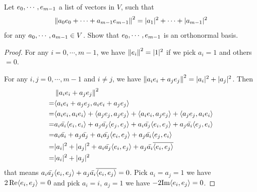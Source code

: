 \documentclass[../main.tex]{subfiles}
\begin{document}
\setcounter{section}{6}

\begin{exercise}
  Let $\join{e}{m - 1}$ a list of vectors in $V$, such that
  \[
  \norm{\joinp[+]{a}{e}{m - 1}}^2 = |a_1|^2 + \cdots + |a_{m - 1}|^2
  \]
  for any $\join{a}{m - 1} \in V$.
  Show that $\join{e}{m - 1}$ is an orthonormal basis.
\end{exercise}
\begin{proof}
  For any $i = 0, \cdots, m - 1$, we have $\norm{e_i}^2 = |1|^2$
  if we pick $a_i = 1$ and others $= 0$.

  For any $i, j = 0, \cdots, m - 1$ and $i \neq j$, we have
  $\norm{a_ie_i + a_je_j}^2 = |a_i|^2 + |a_j|^2$. Then
  \begin{align*}
     & \norm{a_ie_i + a_je_j}^2 \\
    =& \ip{a_ie_i + a_je_j}{a_ie_i + a_je_j} \\
    =& \ip{a_ie_i}{a_ie_i} + \ip{a_je_j}{a_je_j} + \ip{a_ie_i}{a_je_j} + \ip{a_je_j}{a_ie_i} \\
    =& a_i\bar{a_i}\ip{e_i}{e_i} + a_j\bar{a_j}\ip{e_j}{e_j} + a_i\bar{a_j}\ip{e_i}{e_j} + a_j\bar{a_i}\ip{e_j}{e_i} \\
    =& a_i\bar{a_i} + a_j\bar{a_j} + a_i\bar{a_j}\ip{e_i}{e_j} + a_j\bar{a_i}\ip{e_j}{e_i} \\
    =& |a_i|^2 + |a_j|^2 + a_i\bar{a_j}\ip{e_i}{e_j} + a_j\bar{a_i}\overline{\ip{e_i}{e_j}} \\
    =& |a_i|^2 + |a_j|^2
  \end{align*}
  that means $a_i\bar{a_j}\ip{e_i}{e_j} + a_j\bar{a_i}\overline{\ip{e_i}{e_j}} = 0$. 
  Pick $a_i = a_j = 1$ we have $2 \real \ip{e_i}{e_j} = 0$ and pick $a_i = i$, $a_j = 1$
  we have $- 2 \textnormal{Im} \ip{e_i}{e_j} = 0$.
\end{proof}
\end{document}
